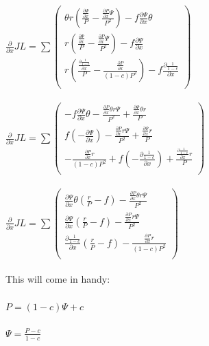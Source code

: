 \documentclass{article}
\begin{document}
$\frac{\partial }{\partial x} JL = 
\sum ( \begin{array}{c}
  \theta r (\frac{\frac{\partial \Psi }{\partial x}}{P}-\frac{\frac{\partial P}{\partial x} \Psi }{P^2})-f \frac{\partial \Psi }{\partial x} \theta \\
  r (\frac{\frac{\partial \Psi }{\partial x}}{P}-\frac{\frac{\partial P}{\partial x} \Psi }{P^2})-f \frac{\partial \Psi }{\partial x} \\
  r (\frac{\frac{\partial \frac{1}{1-c}}{\partial x}}{P}-\frac{\frac{\partial P}{\partial x}}{(1-c) P^2})-f \frac{\partial \frac{1}{1-c}}{\partial x} \\
\end{array} )$
\\\\
$\frac{\partial }{\partial x} JL =
\sum ( \begin{array}{c}
  -f \frac{\partial \Psi }{\partial x} \theta -\frac{\frac{\partial P}{\partial x} \theta r \Psi }{P^2}+\frac{\frac{\partial \Psi }{\partial x} \theta r}{P} \\
  f (-\frac{\partial \Psi }{\partial x})-\frac{\frac{\partial P}{\partial x} r \Psi }{P^2}+\frac{\frac{\partial \Psi }{\partial x} r}{P} \\
  -\frac{\frac{\partial P}{\partial x} r}{(1-c) P^2}+f (-\frac{\partial \frac{1}{1-c}}{\partial x})+\frac{\frac{\partial \frac{1}{1-c}}{\partial x} r}{P} \\
\end{array} )$
\\\\
$\frac{\partial }{\partial x} JL = 
\sum ( \begin{array}{c}
  \frac{\partial \Psi }{\partial x} \theta (\frac{r}{P}-f)-\frac{\frac{\partial P}{\partial x} \theta r \Psi }{P^2} \\
  \frac{\partial \Psi }{\partial x} (\frac{r}{P}-f)-\frac{\frac{\partial P}{\partial x} r \Psi }{P^2} \\
  \frac{\partial \frac{1}{1-c}}{\partial x} (\frac{r}{P}-f)-\frac{\frac{\partial P}{\partial x} r}{(1-c) P^2} \\
\end{array} )$
\\\\
This will come in handy:
\\\\
$P=(1-c) \Psi +c$
\\\\
$\Psi =\frac{P-c}{1-c}$
\\\\
\end{document}
